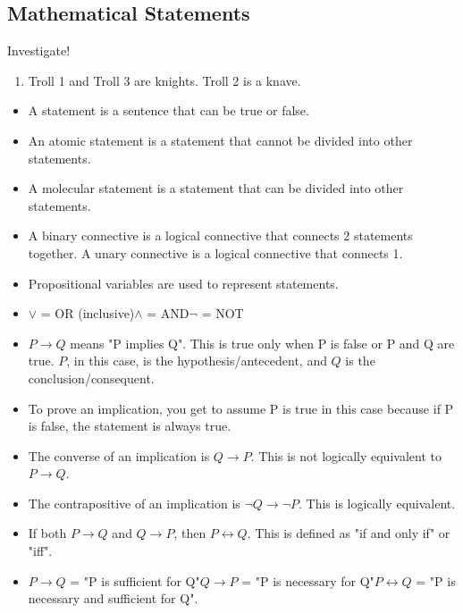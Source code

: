 \subsection{Mathematical Statements}

\begin{mdframed}Investigate!
    \begin{enumerate}
        \item Troll 1 and Troll 3 are knights. Troll 2 is a knave.
    \end{enumerate}
\end{mdframed}

\begin{itemize}
    \item A statement is a sentence that can be true or false.
    
    \item An atomic statement is a statement that cannot be divided into other statements.
    
    \item A molecular statement is a statement that can be divided into other statements.
    
    \item A binary connective is a logical connective that connects 2 statements together. A unary connective is a logical connective that connects 1.
    
    \item Propositional variables are used to represent statements.
    
    \item $\vee$ = OR (inclusive)\newline$\wedge$ = AND\newline$\neg$ = NOT
    
    \item $P \rightarrow Q$ means "P implies Q". This is true only when P is false or P and Q are true. $P$, in this case, is the hypothesis/antecedent, and $Q$ is the conclusion/consequent.
        
    \item To prove an implication, you get to assume P is true in this case because if P is false, the statement is always true.
    
    \item The converse of an implication is $Q \rightarrow P$. This is not logically equivalent to $P \rightarrow Q$.
    
    \item The contrapositive of an implication is $\neg Q \rightarrow \neg P$. This is logically equivalent.
    
    \item If both $P \rightarrow Q$ and $Q \rightarrow P$, then $P \leftrightarrow Q$. This is defined as "if and only if" or "iff".
    
    \item $P \rightarrow Q$ = "P is sufficient for Q"\newline$Q \rightarrow P$ = "P is necessary for Q"\newline$P \leftrightarrow Q$ = "P is necessary and sufficient for Q".
\end{itemize}

